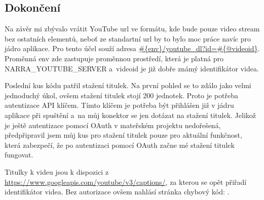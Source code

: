 \subsection{Dokončení}
\par Na závěr mi zbývalo vrátit YouTube url ve formátu, kde bude pouze video stream bez ostatních elementů, neboť ze standartní url by to bylo moc práce navíc pro jádro aplikace. Pro tento účel souží adresa \url{#{env}/youtube_dl?id=#{@videoid}}. Proměnná env zde zastupuje proměnnou prostředí, která je platná pro NARRA\_YOUTUBE\_SERVER a~videoid je již dobře známý identifikátor videa.
\par Poslední kus kódu patřil stažení titulek. Na první pohled se to zdálo jako velmi jednoduchý úkol, ovšem stažení titulek stojí 200 jednotek. Proto je potřeba autentizace API klíčem. Tímto klíčem je potřeba být přihlášen již v jádru aplikace při spuštění a~na můj konektor se jen dotázat na stažení titulek. Jelikož je ještě autentizace pomocí OAuth v mateřském projektu nedořešená, předpřipravil jsem můj kus pro stažení titulek pouze pro aktuální funkčnost, která zabezpečí, že po autentizaci pomocí OAuth začne mé stažení titulek fungovat.
\par Titulky k videu jsou k dispozici z \url{https://www.googleapis.com/youtube/v3/captions/}, za kterou se opět přiřadí identifikátor videa. Bez autorizace ovšem nahlásí stránka chybový kód: .